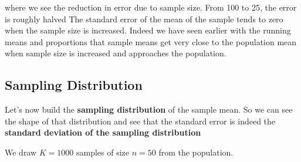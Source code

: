 \documentclass[
  letterpaper,
  DIV=11,
  numbers=noendperiod]{scrreprt}
\newenvironment{Shaded}{\begin{snugshade}}{\end{snugshade}}
\newcommand{\AttributeTok}[1]{\textcolor[rgb]{0.40,0.45,0.13}{#1}}
\newcommand{\ConstantTok}[1]{\textcolor[rgb]{0.56,0.35,0.01}{#1}}
\newcommand{\ControlFlowTok}[1]{\textcolor[rgb]{0.00,0.23,0.31}{\textbf{#1}}}
\newcommand{\DecValTok}[1]{\textcolor[rgb]{0.68,0.00,0.00}{#1}}
\newcommand{\FloatTok}[1]{\textcolor[rgb]{0.68,0.00,0.00}{#1}}
\newcommand{\FunctionTok}[1]{\textcolor[rgb]{0.28,0.35,0.67}{#1}}
\newcommand{\NormalTok}[1]{\textcolor[rgb]{0.00,0.23,0.31}{#1}}
\newcommand{\OtherTok}[1]{\textcolor[rgb]{0.00,0.23,0.31}{#1}}
\newcommand{\SpecialCharTok}[1]{\textcolor[rgb]{0.37,0.37,0.37}{#1}}
\newcommand{\StringTok}[1]{\textcolor[rgb]{0.13,0.47,0.30}{#1}}
\begin{document}
where we see the reduction in error due to sample size. From 100 to 25,
the error is roughly halved The standard error of the mean of the sample
tends to zero when the sample size is increased. Indeed we have seen
earlier with the running means and proportions that sample means get
very close to the population mean when sample size is increased and
approaches the population.

\subsection{Sampling Distribution}\label{sampling-distribution}

Let's now build the \textbf{sampling distribution} of the sample mean.
So we can see the shape of that distribution and see that the standard
error is indeed the \textbf{standard deviation of the sampling
distribution}

We draw \(K = 1000\) samples of size \(n = 50\) from the population.

\begin{Shaded}
\end{Shaded}
\end{document}
